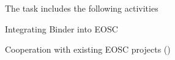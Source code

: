 \begin{task}[
  title=Exploring deployment of BinderHub on EOSC,
  id=eosc,
  lead=EGI,
  PM=33,
  wphases={12-48},
  partners={EGI,SRL,WTT}
]
  The task includes the following activities

  \begin{compactitem}
  \item Integrating Binder into EOSC
  \item Cooperation with existing EOSC projects
    ()
  \end{compactitem}
\end{task}
